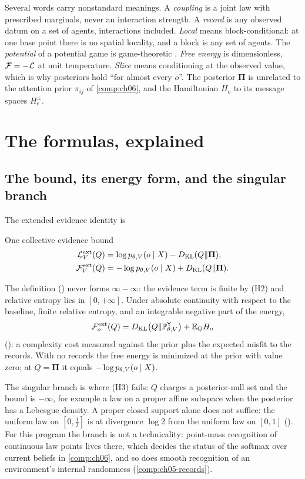 Several words carry nonstandard meanings. A \emph{coupling} is a joint law with prescribed
marginals, never an interaction strength. A \emph{record} is any observed datum on a set of agents,
interactions included. \emph{Local} means block-conditional: at one base point there is no spatial
locality, and a block is any set of agents. The \emph{potential} of a potential game is
game-theoretic \citep{MondererShapley1996}. \emph{Free energy} is dimensionless, $\mathcal F=-\mathcal L$ at
unit temperature. \emph{Slice} means conditioning at the observed value, which is why posteriors hold
``for almost every $o$''. The posterior $\boldsymbol\Pi$ is unrelated to the attention prior $\pi_{ij}$
of \cref{comp:ch06}, and the Hamiltonian $H_o$ to its message spaces $H^\pm_e$.

\section{The formulas, explained}
\label{comp:ch05-formulas}

\subsection{The bound, its energy form, and the singular branch}
\label{comp:ch05-bound}

The extended evidence identity is
\begin{keyequation}{One collective evidence bound}
\[
\begin{aligned}
\mathcal L_V^{\mathrm{ext}}(Q)&=\log p_{\theta,V}(o\mid X)-D_{\mathrm{KL}}(Q\Vert\boldsymbol\Pi),\\
\mathcal F_V^{\mathrm{ext}}(Q)&=-\log p_{\theta,V}(o\mid X)+D_{\mathrm{KL}}(Q\Vert\boldsymbol\Pi).
\end{aligned}
\]
\end{keyequation}
The definition () never forms $\infty-\infty$: the evidence term is finite by (H2)
and relative entropy lies in $[0,+\infty]$. Under absolute continuity with respect to the baseline,
finite relative entropy, and an integrable negative part of the energy,
\[
\mathcal F^{\mathrm{ext}}_o(Q)=D_{\mathrm{KL}}\bigl(Q\Vert\mathbb P^{\mathsf Y}_{\theta,V}\bigr)+\mathbb E_QH_o
\]
(): a complexity cost measured against the prior plus the expected
misfit to the records. With no records the free energy is minimized at the prior with value zero; at
$Q=\boldsymbol\Pi$ it equals $-\log p_{\theta,V}(o\mid X)$.

The singular branch is where (H3) fails: $Q$ charges a posterior-null set and the bound is $-\infty$,
for example a law on a proper affine subspace when the posterior has a Lebesgue density. A proper
closed support alone does not suffice: the uniform law on $[0,\tfrac12]$ is at divergence $\log2$ from the
uniform law on $[0,1]$ (). For this program the branch is not a
technicality: point-mass recognition of continuous law points lives there, which decides the status of the
softmax over current beliefs in \cref{comp:ch06}, and so does smooth recognition of an environment's
internal randomness (\cref{comp:ch05-records}).

